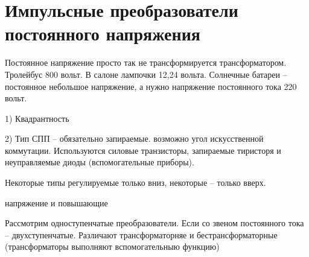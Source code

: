 \section{Импульсные преобразователи постоянного напряжения}

Постоянное напряжение просто так не трансформируется трансформатором. Тролейбус 800 вольт. В салоне лампочки 12,24 вольта.
Солнечные батареи -- постоянное небольшое напряжение, а нужно напряжение постоянного тока 220 вольт. 

1) Квадрантность


2) Тип СПП -- обязательно запираемые. возможно угол искусственной коммутации. Используются силовые транзисторы, запираемые тиристоря и неуправляемые диоды (вспомогательные приборы).

Некоторые типы регулируемые только вниз, некоторые -- только вверх.

\begin{enumerate}
 напряжение
 и повышающие
\end{enumerate}

Рассмотрим одноступенчатые преобразователи. Если со звеном постоянного тока -- двухступенчатые.
Различают трансформаторняе и бестрансформаторные (трансформаторы выполняют вспомогательныю функцию)




